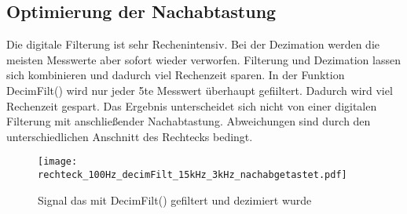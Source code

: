 \documentclass{article}%
\begin{document}
\subsection{Optimierung der Nachabtastung}

	Die digitale Filterung ist sehr Rechenintensiv. Bei der Dezimation werden die meisten Messwerte aber sofort wieder verworfen. Filterung 
	und Dezimation lassen sich kombinieren und dadurch viel Rechenzeit sparen. In der Funktion DecimFilt() wird nur jeder 5te Messwert 
	überhaupt gefiiltert. Dadurch wird viel Rechenzeit gespart. Das Ergebnis unterscheidet sich nicht von einer digitalen Filterung mit 
	anschließender Nachabtastung. Abweichungen sind durch den unterschiedlichen Anschnitt des Rechtecks bedingt.

	\begin{figure}[htb]
		\centering
		\texttt{[image: rechteck\_100Hz\_decimFilt\_15kHz\_3kHz\_nachabgetastet.pdf]}
		\caption{Signal das mit DecimFilt() gefiltert und dezimiert wurde}
	\end{figure}	
\end{document}

